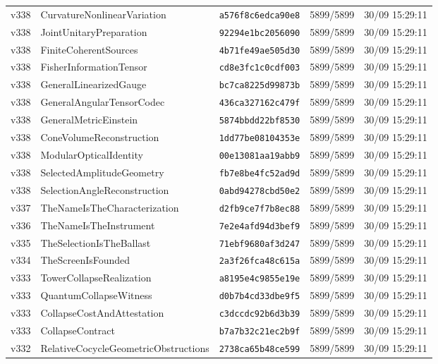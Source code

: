 \documentclass[11pt]{article}
\theoremstyle{definition}\newtheorem{deriv}{Derivation}
\begin{document}
{\begin{longtable}{@{}lllll@{}}
v338 & CurvatureNonlinearVariation & \texttt{a576f8c6edca90e8} & 5899/5899 & 30/09 15:29:11 \\
v338 & JointUnitaryPreparation & \texttt{92294e1bc2056090} & 5899/5899 & 30/09 15:29:11 \\
v338 & FiniteCoherentSources & \texttt{4b71fe49ae505d30} & 5899/5899 & 30/09 15:29:11 \\
v338 & FisherInformationTensor & \texttt{cd8e3fc1c0cdf003} & 5899/5899 & 30/09 15:29:11 \\
v338 & GeneralLinearizedGauge & \texttt{bc7ca8225d99873b} & 5899/5899 & 30/09 15:29:11 \\
v338 & GeneralAngularTensorCodec & \texttt{436ca327162c479f} & 5899/5899 & 30/09 15:29:11 \\
v338 & GeneralMetricEinstein & \texttt{5874bbdd22bf8530} & 5899/5899 & 30/09 15:29:11 \\
v338 & ConeVolumeReconstruction & \texttt{1dd77be08104353e} & 5899/5899 & 30/09 15:29:11 \\
v338 & ModularOpticalIdentity & \texttt{00e13081aa19abb9} & 5899/5899 & 30/09 15:29:11 \\
v338 & SelectedAmplitudeGeometry & \texttt{fb7e8be4fc52ad9d} & 5899/5899 & 30/09 15:29:11 \\
v338 & SelectionAngleReconstruction & \texttt{0abd94278cbd50e2} & 5899/5899 & 30/09 15:29:11 \\
v337 & TheNameIsTheCharacterization & \texttt{d2fb9ce7f7b8ec88} & 5899/5899 & 30/09 15:29:11 \\
v336 & TheNameIsTheInstrument & \texttt{7e2e4afd94d3bef9} & 5899/5899 & 30/09 15:29:11 \\
v335 & TheSelectionIsTheBallast & \texttt{71ebf9680af3d247} & 5899/5899 & 30/09 15:29:11 \\
v334 & TheScreenIsFounded & \texttt{2a3f26fca48c615a} & 5899/5899 & 30/09 15:29:11 \\
v333 & TowerCollapseRealization & \texttt{a8195e4c9855e19e} & 5899/5899 & 30/09 15:29:11 \\
v333 & QuantumCollapseWitness & \texttt{d0b7b4cd33dbe9f5} & 5899/5899 & 30/09 15:29:11 \\
v333 & CollapseCostAndAttestation & \texttt{c3dccdc92b6d3b39} & 5899/5899 & 30/09 15:29:11 \\
v333 & CollapseContract & \texttt{b7a7b32c21ec2b9f} & 5899/5899 & 30/09 15:29:11 \\
v332 & RelativeCocycleGeometricObstructions & \texttt{2738ca65b48ce599} & 5899/5899 & 30/09 15:29:11 \\

\end{longtable}}
\end{document}
